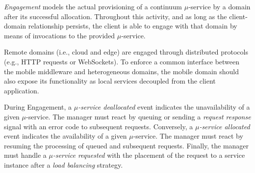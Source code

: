 \textit{Engagement} models the actual provisioning of a continuum $\mu$-service by a domain after its successful allocation.
Throughout this activity, and as long as the client-domain relationship persists, the client is able to engage with that domain by means of invocations to the provided $\mu$-service. 

Remote domains (i.e., cloud and edge) are engaged through distributed protocols (e.g., HTTP requests or WebSockets). To enforce a common interface between the mobile middleware and heterogeneous domains, the mobile domain should also expose its functionality as local services decoupled from the client application.

During Engagement, a \textit{$\mu$-service deallocated} event indicates the unavailability of a given $\mu$-service. The manager must react by queuing or sending a \textit{request response} signal with an error code to subsequent requests. Conversely, a \textit{$\mu$-service allocated} event indicates the availability of a given $\mu$-service. The manager must react by resuming the processing of queued and subsequent requests. Finally, the manager must handle a \textit{$\mu$-service requested} with the placement of the request to a service instance after a \textit{load balancing} strategy.


%
%		
%		
%		

